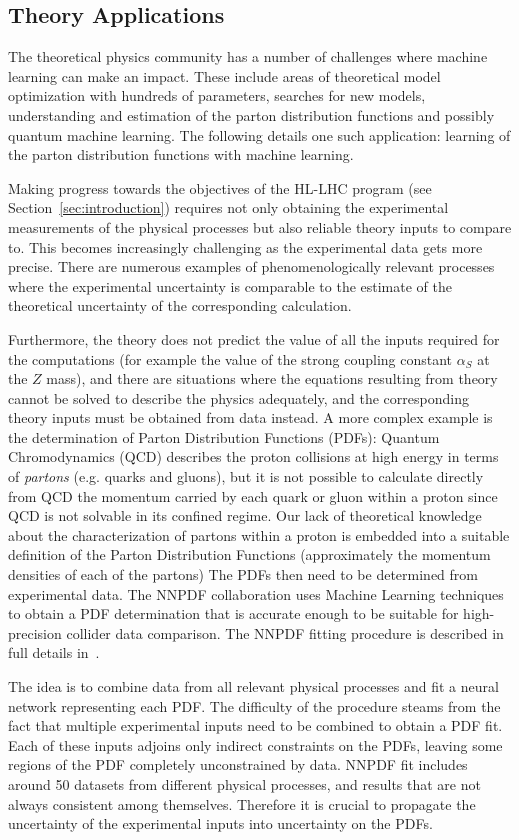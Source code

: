 \subsection{Theory Applications}

The theoretical physics community has a number of challenges where machine learning can make an impact. These include areas of theoretical model optimization with hundreds of parameters, searches for new models,  understanding and estimation of the parton distribution functions and possibly quantum machine learning. The following details one such application: learning of the parton distribution functions with machine learning.

Making progress towards the objectives of the HL-LHC program (see Section~\ref{sec:introduction}) requires not only
obtaining the experimental measurements of the physical processes but also reliable theory inputs to compare to. This becomes increasingly challenging as the experimental data gets more precise. There are numerous examples of phenomenologically relevant processes where the experimental uncertainty is comparable to the estimate of the theoretical uncertainty of the corresponding calculation.

Furthermore, the theory does not predict the value of all the inputs required for the computations (for example the
value of the strong coupling constant $\alpha_S$ at the $Z$ mass), and there are situations where the equations
resulting from theory cannot be solved to describe the physics adequately, and the corresponding theory inputs must be obtained from data instead. A more complex example is the determination of Parton Distribution Functions (PDFs): Quantum Chromodynamics (QCD) describes the proton collisions at high energy in terms of \emph{partons} (e.g. quarks and gluons), but it is not possible to calculate directly from QCD the momentum carried by each quark or gluon within a proton since QCD is not solvable in its confined regime. Our lack of theoretical knowledge about the characterization of
partons within a proton is embedded into a suitable definition of the Parton Distribution Functions (approximately the momentum densities of each of the partons) The PDFs then need to be determined from experimental data. The NNPDF collaboration uses Machine Learning techniques to obtain a PDF determination that is accurate enough to be suitable for high-precision collider data comparison. The NNPDF fitting procedure is described in full details in~\cite{Ball:2014uwa}.

The idea is to combine data from all relevant physical processes and fit a neural network representing each PDF. The difficulty of the procedure steams from the fact that multiple experimental inputs need to be combined to obtain
a PDF fit. Each of these inputs adjoins only indirect constraints on the PDFs, leaving some regions of the PDF
completely unconstrained by data. NNPDF fit includes around 50 datasets from different physical processes, and results that are not always consistent among themselves. Therefore it is crucial to propagate the uncertainty of the experimental inputs into uncertainty on the PDFs.

